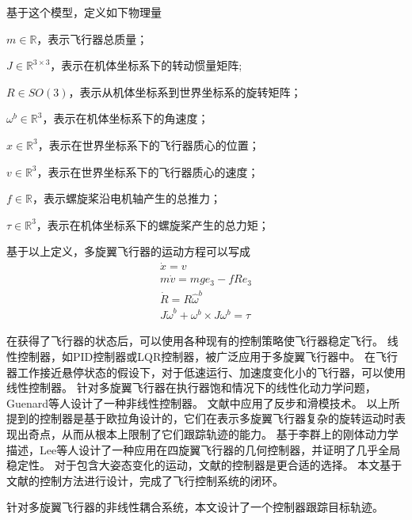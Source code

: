 \documentclass[
  type=master
]{gdutthesis}
\begin{document}
基于这个模型，定义如下物理量

$m \in \mathbb{R}$，表示飞行器总质量；

$J \in \mathbb{R}^{3 \times 3}$，表示在机体坐标系下的转动惯量矩阵;

$R \in SO(3)$，表示从机体坐标系到世界坐标系的旋转矩阵；

$\omega^b \in \mathbb{R}^3$，表示在机体坐标系下的角速度；

$x \in \mathbb{R}^3$，表示在世界坐标系下的飞行器质心的位置；

$v \in \mathbb{R}^3$，表示在世界坐标系下的飞行器质心的速度；

$f \in \mathbb{R}$，表示螺旋桨沿电机轴产生的总推力；

$\tau \in \mathbb{R}^3$，表示在机体坐标系下的螺旋桨产生的总力矩；

基于以上定义，多旋翼飞行器的运动方程可以写成\vspace{1ex}
\begin{gather}\label{eq:dynamics}
		\dot{x} = v\\
		m\dot{v} = mge_3 - fRe_3\\
		\dot{R} = R\hat{\omega}^b\\
		J\dot{\omega}^b + \omega^b \times J \omega^b = \tau
\end{gather}

在获得了飞行器的状态后，可以使用各种现有的控制策略使飞行器稳定飞行。
线性控制器，如PID控制器或LQR控制器，被广泛应用于多旋翼飞行器中\cite{hoffmann2007quadrotor,castillo2004stabilization,nice2004design}。
在飞行器工作接近悬停状态的假设下，对于低速运行、加速度变化小的飞行器，可以使用线性控制器。
针对多旋翼飞行器在执行器饱和情况下的线性化动力学问题，Guenard等人设计了一种非线性控制器\cite{guenard2005dynamic}。
文献\parencite{bouabdallah2005backstepping}中应用了反步和滑模技术。
以上所提到的控制器是基于欧拉角设计的，它们在表示多旋翼飞行器复杂的旋转运动时表现出奇点，从而从根本上限制了它们跟踪轨迹的能力。
基于李群上的刚体动力学描述，Lee等人设计了一种应用在四旋翼飞行器的几何控制器，并证明了几乎全局稳定性\cite{lee2010geometric}。
对于包含大姿态变化的运动，文献\parencite{lee2010geometric}的控制器是更合适的选择。
本文基于文献\parencite{lee2010geometric}的控制方法进行设计，完成了飞行控制系统的闭环。

针对多旋翼飞行器的非线性耦合系统，本文设计了一个控制器跟踪目标轨迹。
\end{document}

